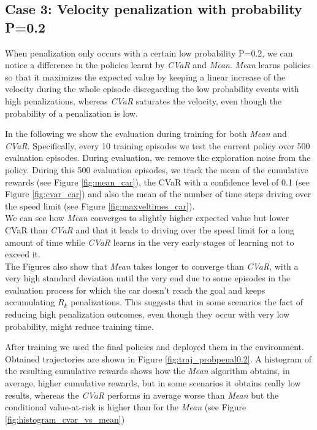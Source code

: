 \newpage
\subsection{Case 3: Velocity penalization with probability P=0.2 }
When penalization only occurs with a certain low probability P=0.2, we can notice a difference
in the policies learnt by \textit{CVaR} and \textit{Mean}.
\textit{Mean} learns policies so that it maximizes the expected
value by keeping a linear increase of the velocity during the whole episode disregarding the low probability events with high penalizations,
whereas \textit{CVaR} saturates the velocity, even though the
probability of a penalization is low.

In the following we show the evaluation during training for both \textit{Mean} and
\textit{CVaR}.
Specifically, every 10 training episodes we test the current policy over 500 evaluation episodes.
During evaluation, we remove the exploration noise from the policy.
During this 500 evaluation episodes, we track the mean of the cumulative rewards (see Figure \ref{fig:mean_car}),
the CVaR with a confidence level of 0.1  (see Figure \ref{fig:cvar_car}) and also the mean of the number of time steps
driving over the
speed limit (see Figure \ref{fig:maxveltimes_car}). \\
We can see how \textit{Mean} converges to slightly higher
expected value but lower CVaR than \textit{CVaR} and that it leads to driving over the speed limit for 
a long amount of time while \textit{CVaR} learns
in the very early stages of learning not to exceed it.\\
The Figures also show that \textit{Mean} takes longer to converge than \textit{CVaR}, with a very high standard deviation
until the very end due to some episodes in the evaluation process for which the car doesn't reach the goal and keeps accumulating
$R_{k}$ penalizations. This suggests that in some scenarios the fact of reducing high penalization outcomes,
even though they occur with very low probability, might reduce training time.

After training we used the final policies and deployed them in the 
environment. Obtained trajectories are shown in Figure \ref{fig:traj_probpenal0.2}.
A histogram of the resulting cumulative rewards shows
how the \textit{Mean} algorithm obtains, in average, higher cumulative rewards, but in some scenarios it 
obtains really low results, whereas the \textit{CVaR} performs in average worse than \textit{Mean} 
but the conditional value-at-risk is higher than for the \textit{Mean} (see Figure \ref{fig:histogram_cvar_vs_mean})

